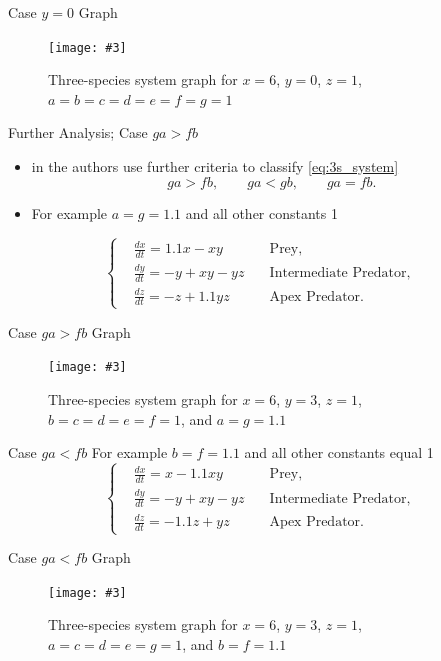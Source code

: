\documentclass[hyperref={colorlinks,allcolors=black}]{beamer}
\newcommand{\makefig}[4]{
\begin{figure}[#1]
    \captionsetup{justification=centering}
    \texttt{[image: \#3]}
    \caption{#4}
    \label{fig:#3}
\end{figure}
}
\begin{document}
\begin{frame}{Case $y=0$ Graph}
\makefig{h}{0.9\textwidth}{3s_y_zero_graph}{Three-species system graph for $x=6$, $y=0$, $z=1$, $a=b=c=d=e=f=g=1$}
\end{frame}

\begin{frame}{Further Analysis; Case $ga>fb$}
\begin{itemize}
\setlength\itemsep{1em}
    \item in \cite{chauvet} the authors use further criteria to
        classify \eqref{eq:3s_system}
\begin{equation}\nonumber
    ga > fb, \qquad ga < gb, \qquad  ga = fb.
\end{equation}
\item For example $a=g=1.1$ and all other constants 1
\end{itemize}
\begin{equation}\nonumber
    \left\{\begin{aligned}
        &\frac{dx}{dt} = 1.1x - xy              &\text{Prey,}\\
        &\frac{dy}{dt} = -y + xy - yz \quad &\text{Intermediate Predator,}\\
        &\frac{dz}{dt} = -z + 1.1yz             &\text{Apex Predator.}
    \end{aligned}\right.
\end{equation}
\end{frame}

\begin{frame}{Case $ga>fb$ Graph}
\makefig{h}{0.9\textwidth}{3s_ga_g_fb_graph}{Three-species system graph for $x=6$, $y=3$, $z=1$, $b=c=d=e=f=1$, and $a=g=1.1$}
\end{frame}

\begin{frame}{Case $ga < fb$}
For example $b=f=1.1$ and all other constants equal 1
\begin{equation}\nonumber
    \left\{\begin{aligned}
        &\frac{dx}{dt} = x - 1.1xy              &\text{Prey,}\\
        &\frac{dy}{dt} = -y + xy - yz \quad &\text{Intermediate Predator,}\\
        &\frac{dz}{dt} = -1.1z + yz             &\text{Apex Predator.}
    \end{aligned}\right.
\end{equation}
\end{frame}

\begin{frame}{Case $ga < fb$ Graph}
\makefig{h}{0.9\textwidth}{3s_ga_l_fb_graph}{Three-species system graph for $x=6$, $y=3$, $z=1$, $a=c=d=e=g=1$, and $b=f=1.1$}
\end{frame}
\end{document}
